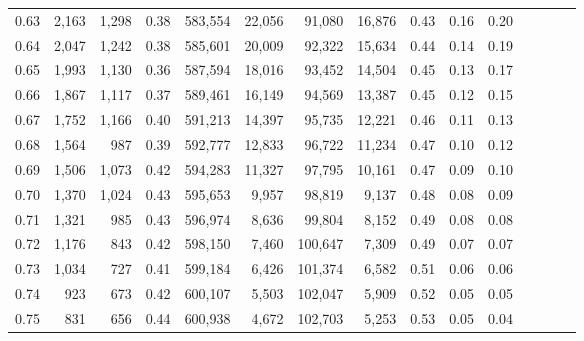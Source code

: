 \begin{tabular}{rrrcrrrrrrrrrrr}
0.63 &   2,163 &  1,298 &                                       0.38 &  583,554 &   22,056 &   91,080 &   16,876 &  0.43 &  0.16 &                         0.20 \\
0.64 &   2,047 &  1,242 &                                       0.38 &  585,601 &   20,009 &   92,322 &   15,634 &  0.44 &  0.14 &                         0.19 \\
0.65 &   1,993 &  1,130 &                                       0.36 &  587,594 &   18,016 &   93,452 &   14,504 &  0.45 &  0.13 &                         0.17 \\
0.66 &   1,867 &  1,117 &                                       0.37 &  589,461 &   16,149 &   94,569 &   13,387 &  0.45 &  0.12 &                         0.15 \\
0.67 &   1,752 &  1,166 &                                       0.40 &  591,213 &   14,397 &   95,735 &   12,221 &  0.46 &  0.11 &                         0.13 \\
0.68 &   1,564 &    987 &                                       0.39 &  592,777 &   12,833 &   96,722 &   11,234 &  0.47 &  0.10 &                         0.12 \\
0.69 &   1,506 &  1,073 &                                       0.42 &  594,283 &   11,327 &   97,795 &   10,161 &  0.47 &  0.09 &                         0.10 \\
0.70 &   1,370 &  1,024 &                                       0.43 &  595,653 &    9,957 &   98,819 &    9,137 &  0.48 &  0.08 &                         0.09 \\
0.71 &   1,321 &    985 &                                       0.43 &  596,974 &    8,636 &   99,804 &    8,152 &  0.49 &  0.08 &                         0.08 \\
0.72 &   1,176 &    843 &                                       0.42 &  598,150 &    7,460 &  100,647 &    7,309 &  0.49 &  0.07 &                         0.07 \\
0.73 &   1,034 &    727 &                                       0.41 &  599,184 &    6,426 &  101,374 &    6,582 &  0.51 &  0.06 &                         0.06 \\
0.74 &     923 &    673 &                                       0.42 &  600,107 &    5,503 &  102,047 &    5,909 &  0.52 &  0.05 &                         0.05 \\
0.75 &     831 &    656 &                                       0.44 &  600,938 &    4,672 &  102,703 &    5,253 &  0.53 &  0.05 &                         0.04 \\

\end{tabular}

